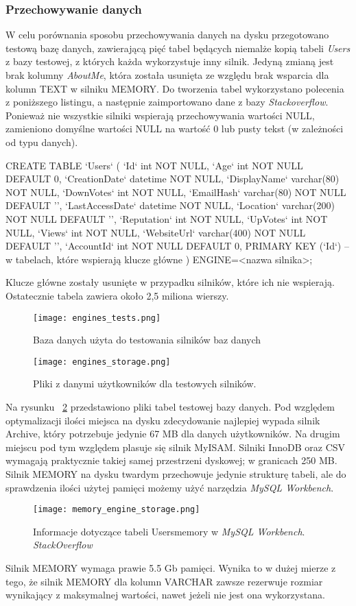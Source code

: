 \subsubsection{Przechowywanie danych}
W celu porównania sposobu przechowywania danych na dysku przegotowano testową bazę danych, zawierającą pięć tabel będących niemalże kopią tabeli \textit{Users} z bazy testowej, z których każda wykorzystuje inny silnik. Jedyną zmianą jest brak kolumny \textit{AboutMe}, która została usunięta ze względu brak wsparcia dla kolumn TEXT w silniku MEMORY. Do tworzenia tabel wykorzystano polecenia z poniższego listingu, a następnie zaimportowano dane z bazy \textit{Stackoverflow}. Ponieważ nie wszystkie silniki wspierają przechowywania wartości NULL, zamieniono domyślne wartości NULL na wartość 0 lub pusty tekst (w zależności od typu danych).
\begin{spverbatim}
	CREATE TABLE `Users` (
	`Id` int NOT NULL,
	`Age` int NOT NULL DEFAULT 0,
	`CreationDate` datetime NOT NULL,
	`DisplayName` varchar(80) NOT NULL,
	`DownVotes` int NOT NULL,
	`EmailHash` varchar(80) NOT NULL DEFAULT '',
	`LastAccessDate` datetime NOT NULL,
	`Location` varchar(200) NOT NULL DEFAULT '',
	`Reputation` int NOT NULL,
	`UpVotes` int NOT NULL,
	`Views` int NOT NULL,
	`WebsiteUrl` varchar(400) NOT NULL DEFAULT '',
	`AccountId` int NOT NULL DEFAULT 0,
	PRIMARY KEY (`Id`) -- w tabelach, które wspierają klucze główne
	) ENGINE=<nazwa silnika>;
\end{spverbatim}
Klucze główne zostały usunięte w przypadku silników, które ich nie wspierają. Ostatecznie tabela zawiera około 2,5 miliona wierszy.
\begin{figure}[!h]
	\caption{Baza danych użyta do testowania silników baz danych}
	\centering
	\texttt{[image: engines\_tests.png]}
	\label{fig:label}
\end{figure}
\begin{figure}[!h]
	\caption{Pliki z danymi użytkowników dla testowych silników.}
	\centering
	\texttt{[image: engines\_storage.png]}
	\label{fig:engines_storage}
\end{figure}

Na rysunku ~\ref{fig:engines_storage} przedstawiono pliki tabel testowej bazy danych. Pod względem optymalizacji ilości miejsca na dysku zdecydowanie najlepiej wypada silnik Archive, który potrzebuje jedynie 67 MB dla danych użytkowników. Na drugim miejscu pod tym względem plasuje się silnik MyISAM. Silniki InnoDB oraz CSV wymagają praktycznie takiej samej przestrzeni dyskowej; w granicach 250 MB. Silnik MEMORY na dysku twardym przechowuje jedynie strukturę tabeli, ale do sprawdzenia ilości użytej pamięci możemy użyć narzędzia \textit{MySQL Workbench}.
\begin{figure}[!h]
	\caption{Informacje dotyczące tabeli Users\textunderscore memory w \textit{MySQL Workbench}. \textit{StackOverflow}}
	\centering
	\texttt{[image: memory\_engine\_storage.png]}
	\label{fig:label}
\end{figure}
Silnik MEMORY wymaga prawie 5.5 Gb pamięci. Wynika to w dużej mierze z tego, że silnik MEMORY dla kolumn VARCHAR zawsze rezerwuje rozmiar wynikający z maksymalnej wartości, nawet jeżeli nie jest ona wykorzystana.




